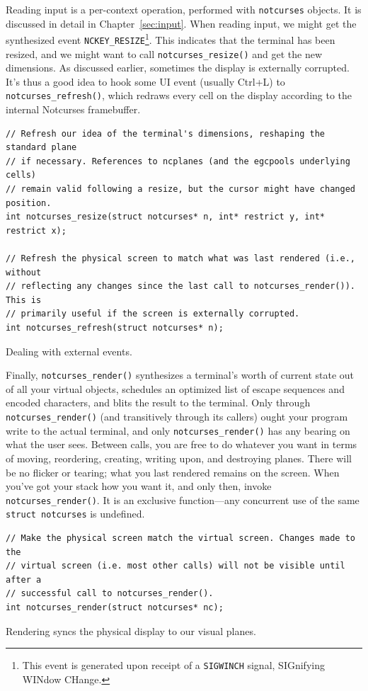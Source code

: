\documentclass[letterpaper,10pt]{article}
\begin{document}
Reading input is a per-context operation, performed with \texttt{notcurses}
objects. It is discussed in detail in Chapter~\ref{sec:input}. When reading
input, we might get the synthesized event \texttt{NCKEY\_RESIZE}\footnote{This
event is generated upon receipt of a \texttt{SIGWINCH} signal, SIGnifying WINdow
CHange.}. This indicates that the terminal has been resized, and we might want
to call \texttt{notcurses\_resize()} and get the new dimensions. As discussed
earlier, sometimes the display is externally corrupted. It's thus a good idea
to hook some UI event (usually Ctrl+L) to \texttt{notcurses\_refresh()}, which
redraws every cell on the display according to the internal Notcurses
framebuffer.

\begin{listing}[!htbp]
\begin{verbatim}
// Refresh our idea of the terminal's dimensions, reshaping the standard plane
// if necessary. References to ncplanes (and the egcpools underlying cells)
// remain valid following a resize, but the cursor might have changed position.
int notcurses_resize(struct notcurses* n, int* restrict y, int* restrict x);

// Refresh the physical screen to match what was last rendered (i.e., without
// reflecting any changes since the last call to notcurses_render()). This is
// primarily useful if the screen is externally corrupted.
int notcurses_refresh(struct notcurses* n);
\end{verbatim}
\caption{Dealing with external events.}
\end{listing}

Finally, \texttt{notcurses\_render()} synthesizes a terminal's worth of current
state out of all your virtual objects, schedules an optimized list of escape
sequences and encoded characters, and blits the result to the terminal. Only
through \texttt{notcurses\_render()} (and transitively through its callers) ought
your program write to the actual terminal, and only \texttt{notcurses\_render()}
has any bearing on what the user sees. Between calls, you are free to do whatever
you want in terms of moving, reordering, creating, writing upon, and destroying
planes. There will be no flicker or tearing; what you last rendered remains on
the screen. When you've got your stack how you want it, and only then, invoke
\texttt{notcurses\_render()}. It is an exclusive function---any concurrent use
of the same \texttt{struct notcurses} is undefined.

\begin{listing}[!htbp]
\begin{verbatim}
// Make the physical screen match the virtual screen. Changes made to the
// virtual screen (i.e. most other calls) will not be visible until after a
// successful call to notcurses_render().
int notcurses_render(struct notcurses* nc);
\end{verbatim}
\caption{Rendering syncs the physical display to our visual planes.}
\end{listing}
\end{document}
